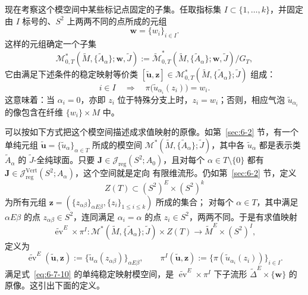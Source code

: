 现在考察这个模空间中某些标记点固定的子集。任取指标集
$I\subset\{1,\ldots,k\}$，并固定由 $I$ 标号的、$S^2$ 上两两不同的点所成的元组
\[
  \mathbf w=\{w_i\}_{i\in I}.
\]
这样的元组确定一个子集
\[
  \mathcal M^*_{0,T}
    (\widetilde M,\{\widetilde A_\alpha\};\mathbf w,\widetilde J)
  :=\widetilde{\mathcal M}^*_{0,T}
    (\widetilde M,\{\widetilde A_\alpha\};\mathbf w,\widetilde J)/G_T,
\]
它由满足下述条件的稳定映射等价类
$[\widetilde{\mathbf u},\mathbf z]\in
\mathcal M^*_{0,T}(\widetilde M,\{\widetilde A_\alpha\};\widetilde J)$ 组成：
\begin{equation}\label{eq:6-7-10}
  i\in I
  \quad\Longrightarrow\quad
  \pi\bigl(\widetilde u_{\alpha_i}(z_i)\bigr)=w_i.
\end{equation}
这意味着：当 $\alpha_i=0$，亦即 $z_i$ 位于特殊分支上时，$z_i=w_i$；否则，相应气泡
$\widetilde u_{\alpha_i}$ 的像包含在纤维 $\{w_i\}\times M$ 中。

可以按如下方式把这个模空间描述成求值映射的原像。如第~\ref{sec:6-2} 节，有一个单纯元组
$\widetilde{\mathbf u}=\{\widetilde u_\alpha\}_{\alpha\in T}$ 所成的模空间
$\mathcal M^*(\widetilde M,\{\widetilde A_\alpha\};\widetilde J)$，其中各
$\widetilde u_\alpha$ 都是表示类 $\widetilde A_\alpha$ 的 $\widetilde J$-全纯球面。只要
$\mathbf J\in\mathcal J_{\mathrm{reg}}(S^2;A_0)$，且对每个
$\alpha\in T\setminus\{0\}$ 都有
$\mathbf J\in\mathcal J_{\mathrm{reg}}^{\mathrm{Vert}}(S^2;A_\alpha)$，这个空间就是定向
有限维流形。仍如第~\ref{sec:6-2} 节，定义
\[
  Z(T)\subset(S^2)^E\times(S^2)^k
\]
为所有元组
$\mathbf z=(\{z_{\alpha\beta}\}_{\alpha E\beta},\{z_i\}_{1\le i\le k})$ 所成的集合；
对每个 $\alpha\in T$，其中满足 $\alpha E\beta$ 的点 $z_{\alpha\beta}\in S^2$，连同满足
$\alpha_i=\alpha$ 的点 $z_i\in S^2$，两两不同。于是有求值映射
\begin{equation}\label{eq:6-7-11}
  \widetilde{\operatorname{ev}}^E\times\pi^I:
  \mathcal M^*(\widetilde M,\{\widetilde A_\alpha\};\widetilde J)\times Z(T)
  \longrightarrow\widetilde M^E\times(S^2)^I,
\end{equation}
定义为
\[
  \widetilde{\operatorname{ev}}^E(\widetilde{\mathbf u},\mathbf z)
  :=\{\widetilde u_\alpha(z_{\alpha\beta})\}_{\alpha E\beta},
  \qquad
  \pi^I(\widetilde{\mathbf u},\mathbf z)
  :=\{\pi(\widetilde u_{\alpha_i}(z_i))\}_{i\in I}.
\]
满足式~\eqref{eq:6-7-10} 的单纯稳定映射模空间，是
$\widetilde{\operatorname{ev}}^E\times\pi^I$ 下子流形
$\widetilde\Delta^E\times\{\mathbf w\}$ 的原像。这引出下面的定义。

